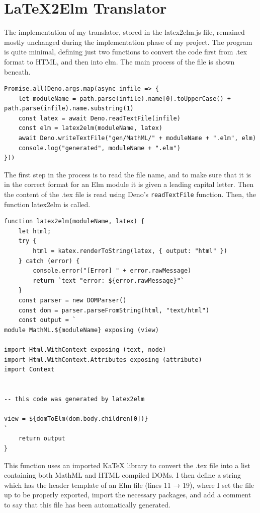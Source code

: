 \documentclass{l4proj}
\begin{document}
\section{LaTeX2Elm Translator}

The implementation of my translator, stored in the latex2elm.js file, remained mostly unchanged during the implementation phase of my project.  The program is quite minimal, defining just two functions to convert the code first from .tex format to HTML, and then into elm.  The main process of the file is shown beneath.

\begin{lstlisting}
Promise.all(Deno.args.map(async infile => {
    let moduleName = path.parse(infile).name[0].toUpperCase() +                     path.parse(infile).name.substring(1)
    const latex = await Deno.readTextFile(infile)
    const elm = latex2elm(moduleName, latex)
    await Deno.writeTextFile("gen/MathML/" + moduleName + ".elm", elm)
    console.log("generated", moduleName + ".elm")
}))
\end{lstlisting}

The first step in the process is to read the file name, and to make sure that it is in the correct format for an Elm module it is given a leading capital letter.  Then the content of the .tex file is read using Deno's \texttt{readTextFile} function.  Then, the function latex2elm is called.

\begin{lstlisting}
function latex2elm(moduleName, latex) {
    let html;
    try {
        html = katex.renderToString(latex, { output: "html" })
    } catch (error) {
        console.error("[Error] " + error.rawMessage)
        return `text "error: ${error.rawMessage}"`
    }
    const parser = new DOMParser()
    const dom = parser.parseFromString(html, "text/html")
    const output = `
module MathML.${moduleName} exposing (view)

import Html.WithContext exposing (text, node)
import Html.WithContext.Attributes exposing (attribute)
import Context


-- this code was generated by latex2elm

view = ${domToElm(dom.body.children[0])}
`
    return output
}
\end{lstlisting}

This function uses an imported KaTeX library to convert the .tex file into a list containing both MathML and HTML compiled DOMs.  I then define a string which has the header template of an Elm file (lines 11 → 19), where I set the file up to be properly exported, import the necessary packages, and add a comment to say that this file has been automatically generated.
\end{document}

